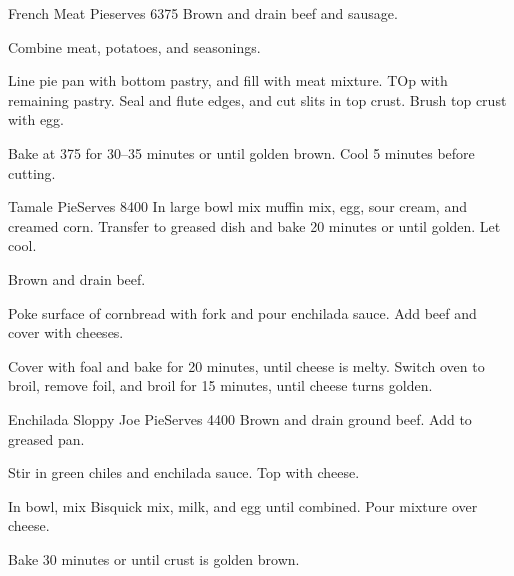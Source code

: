 \begin{recipe}{French Meat Pie}{serves 6}{375\0}
    Brown and drain beef and sausage.

    Combine meat, potatoes, and seasonings.

    Line pie pan with bottom pastry, and fill with meat mixture. TOp with remaining pastry. Seal and flute edges, and cut slits in top crust. Brush top crust with egg.

    \newstep
    Bake at 375\0 for 30--35 minutes or until golden brown. Cool 5 minutes before cutting.
\end{recipe}

\begin{recipe}{Tamale Pie}{Serves 8}{400\0}
    In large bowl mix muffin mix, egg, sour cream, and creamed corn. Transfer to greased dish and bake 20 minutes or until golden. Let cool.

    Brown and drain beef.

    Poke surface of cornbread with fork and pour enchilada sauce. Add beef and cover with cheeses.

    \newstep
    Cover with foal and bake for 20 minutes, until cheese is melty. Switch oven to broil, remove foil, and broil for 15 minutes, until cheese turns golden.
\end{recipe}

\begin{recipe}{Enchilada Sloppy Joe Pie}{Serves 4}{400\0}
    Brown and drain ground beef. Add to greased pan.

    Stir in green chiles and enchilada sauce. Top with cheese.

    In bowl, mix Bisquick mix, milk, and egg until combined. Pour mixture over cheese.

    \newstep
    Bake 30 minutes or until crust is golden brown.
\end{recipe}
